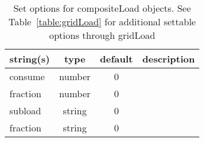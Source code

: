 \begin{table}[ht]
\centering
\begin{tabular}{p{5cm} c c p{7cm}}
\hline
string(s) & type & default & description \\
\hline
consume & number & 0 & \\
fraction & number & 0 & \\
subload & string & 0 & \\
fraction & string & 0 & \\
\hline
\end{tabular}
\caption{Set options for compositeLoad objects. See Table~\ref{table:gridLoad} for additional settable options through gridLoad}
\label{table:compositeLoad}
\end{table}


